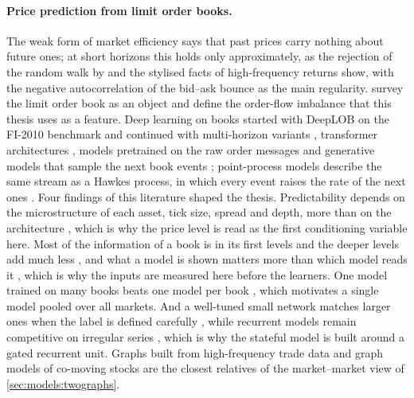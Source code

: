 \paragraph{Price prediction from limit order books.}  The weak form of market efficiency
\cite{fama1970efficient} says that past prices carry nothing about future ones; at short
horizons this holds only approximately, as the rejection of the random walk by
\textcite{lo1988stock} and the stylised facts of high-frequency returns
\cite{cont2001empirical} show, with the negative autocorrelation of the bid--ask bounce as the
main regularity.  \textcite{gould2013limit} survey the limit order book as an object and
\textcite{cont2014price} define the order-flow imbalance that this thesis uses as a feature.
Deep learning on books started with DeepLOB \cite{zhang2019deeplob} on the FI-2010 benchmark
\cite{ntakaris2018benchmark} and continued with multi-horizon variants
\cite{zhang2021multihorizon}, transformer architectures \cite{berti2025tlob}, models
pretrained on the raw order messages \cite{linna2025lobert} and generative models that
sample the next book events \cite{zheng2026lobdif}; point-process models describe the same
stream as a Hawkes process, in which every event raises the rate of the next ones
\cite{cestari2023hawkes,lalor2025neuralhawkes}.  Four findings of this literature shaped the
thesis.  Predictability depends on the microstructure of each asset, tick size, spread and
depth, more than on the architecture \cite{briola2024deep}, which is why the price level is
read as the first conditioning variable here.  Most of the information of a book is in its first levels and the deeper levels add much
less \cite{tran2022beyondbest}, and what a model is shown matters more than which model
reads it \cite{kolm2023dofi,lucchese2024predictability}, which is why the inputs are measured
here before the learners.  One model trained on many books beats one model per book
\cite{sirignano2019universal}, which motivates a single model pooled over all markets.  And a
well-tuned small network matches larger ones when the label is defined carefully
\cite{berti2025tlob}, while recurrent models remain competitive on irregular series
\cite{joshi2026gruwe}, which is why the stateful model is built around a gated recurrent
unit.  Graphs built from high-frequency trade data \cite{karpman2022learning} and graph
models of co-moving stocks \cite{luo2025magicnet} are the closest relatives of the
market--market view of \cref{sec:models:twographs}.

